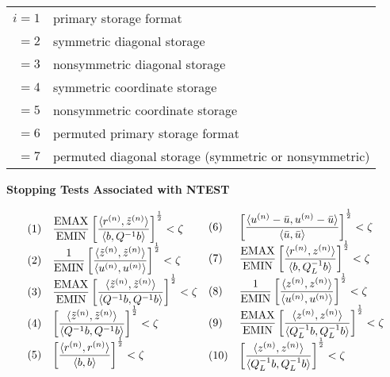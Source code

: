 \bigskip
\begin{tabular}{rl}
       $i = 1$ & primary storage format  \\
       $  = 2$ & symmetric diagonal storage        \\
       $  = 3$ & nonsymmetric diagonal storage     \\
       $  = 4$ & symmetric coordinate storage      \\
       $  = 5$ & nonsymmetric coordinate storage   \\
       $  = 6$ & permuted primary storage format   \\
       $  = 7$ & permuted diagonal storage (symmetric
                   or nonsymmetric)
\end{tabular}

\newpage
\noindent
{\bf Stopping Tests Associated with NTEST}
\bigskip

\[ \begin{array}{ll}
  (1) & {\displaystyle \frac{\mbox{EMAX}}{\mbox{EMIN}} \left[ \frac
        {\langle r^{(n)},\tilde z^{(n)}\rangle }
        {\langle b,Q^{-1}b \rangle} \right] ^{\frac{1}{2}} < \zeta }    \\ 
  (2) & {\displaystyle \frac{1}{\mbox{EMIN}} \left[ \frac
        {\langle \tilde z^{(n)},\tilde z^{(n)}\rangle }
        {\langle u^{(n)},u^{(n)}\rangle } \right] ^{\frac{1}{2}} < \zeta }  \\
  (3) & {\displaystyle \frac{\mbox{EMAX}}{\mbox{EMIN}} \left[ \frac
        {\langle \tilde z^{(n)},\tilde z^{(n)}\rangle}
        {\langle Q^{-1}b,Q^{-1}b\rangle } \right] ^{\frac{1}{2}} < \zeta } \\ 
  (4) & {\displaystyle \left[ \frac{\langle \tilde z^{(n)},\tilde z^{(n)}\rangle }
        {\langle Q^{-1}b,Q^{-1}b\rangle } \right] ^{\frac{1}{2}} < \zeta } \\ 
  (5) & {\displaystyle \left[ \frac{\langle r^{(n)},r^{(n)}\rangle}
        {\langle b,b \rangle } \right] ^{\frac{1}{2}} < \zeta }   
\end{array}
\begin{array}{ll}
  (6) & {\displaystyle \left[ \frac{\langle u^{(n)}-\bar{u},u^{(n)}-\bar{u} \rangle }  
        {\langle \bar{u},\bar{u} \rangle } \right]^{\frac{1}{2}} < \zeta }  \\
  (7) & {\displaystyle \frac{\mbox{EMAX}}{\mbox{EMIN}} \left[ \frac
        {\langle r^{(n)},z^{(n)}\rangle }
        {\langle b,Q_L^{-1}b \rangle} \right] ^{\frac{1}{2}} < \zeta } \\
  (8) & {\displaystyle \frac{1}{\mbox{EMIN}} \left[ \frac
        {\langle z^{(n)},z^{(n)}\rangle }
        {\langle u^{(n)},u^{(n)}\rangle } \right] ^{\frac{1}{2}} < \zeta } \\
  (9) & {\displaystyle \frac{\mbox{EMAX}}{\mbox{EMIN}} \left[ \frac
        {\langle z^{(n)},z^{(n)}\rangle}
        {\langle Q_L^{-1}b,Q_L^{-1}b\rangle } \right] ^{\frac{1}{2}} < \zeta } \\ 
 (10) & {\displaystyle \left[ \frac{\langle z^{(n)},z^{(n)}\rangle }
        {\langle Q_L^{-1}b,Q_L^{-1}b\rangle } \right] ^{\frac{1}{2}} < \zeta }
\end{array}  \]

